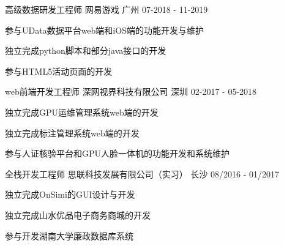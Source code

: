 \begin{cventries}
  \cventry
    {高级数据研发工程师}
    {网易游戏}
    {广州}
    {07-2018 - 11-2019}
    {
      \begin{cvitems}
        \item {参与UData数据平台web端和iOS端的功能开发与维护}
        \item {独立完成python脚本和部分java接口的开发}
        \item {参与HTML5活动页面的开发}
      \end{cvitems}
    }
  \cventry
    {web前端开发工程师}
    {深网视界科技有限公司}
    {深圳}
    {02-2017 - 05-2018}
    {
      \begin{cvitems}
        \item {独立完成GPU运维管理系统web端的开发}
        \item {独立完成标注管理系统web端的开发}
        \item {参与人证核验平台和GPU人脸一体机的功能开发和系统维护}
      \end{cvitems}
    }
  \cventry
    {全栈开发工程师}
    {思联科技发展有限公司（实习）}
    {长沙}
    {08/2016 - 01/2017}
    {
      \begin{cvitems}
        \item {独立完成OnSimi的GUI设计与开发}
        \item {独立完成山水优品电子商务商城的开发}
        \item {参与开发湖南大学廉政数据库系统}
      \end{cvitems}
    }
\end{cventries}

